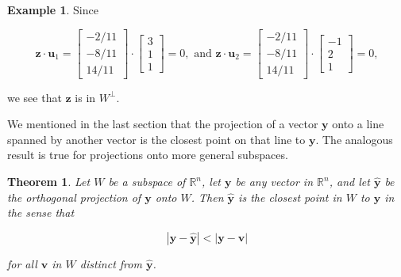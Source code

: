 \documentclass[
]{book}
\newtheorem{theorem}{Theorem}[chapter]
\theoremstyle{definition}
\theoremstyle{definition}
\newtheorem{example}{Example}[chapter]
\theoremstyle{definition}
\theoremstyle{definition}
\theoremstyle{remark}
\begin{document}
\begin{examplebox}
\begin{example}
Since

\[\mathbf{z}\cdot \mathbf{u}_1=\begin{bmatrix}-2/11\\-8/11\\14/11\end{bmatrix}\cdot\begin{bmatrix}3\\1\\1\end{bmatrix}=0,\text{ and }\mathbf{z}\cdot \mathbf{u}_2=\begin{bmatrix}-2/11\\-8/11\\14/11\end{bmatrix}\cdot\begin{bmatrix}-1\\2\\1\end{bmatrix}=0,\]

we see that \(\mathbf{z}\) is in \(W^\perp\).
\end{example}

\end{examplebox}

We mentioned in the last section that the projection of a vector \(\mathbf{y}\) onto a line spanned by another vector is the closest point on that line to \(\mathbf{y}\). The analogous result is true for projections onto more general subspaces.

\begin{theorembox}

\begin{theorem}
\protect\hypertarget{thm:lsp}{}\label{thm:lsp}Let \(W\) be a subspace of \(\mathbb{R}^n\), let \(\mathbf{y}\) be any vector in \(\mathbb{R}^n\), and let \(\hat{\mathbf{y}}\) be the orthogonal projection of \(\mathbf{y}\) onto \(W\). Then \(\hat{\mathbf{y}}\) is the closest point in \(W\) to \(\mathbf{y}\) in the sense that

\[|\mathbf{y}-\hat{\mathbf{y}}|< |\mathbf{y}-\mathbf{v}|\]

for all \(\mathbf{v}\) in \(W\) distinct from \(\hat{\mathbf{y}}\).
\end{theorem}

\end{theorembox}
\end{document}
